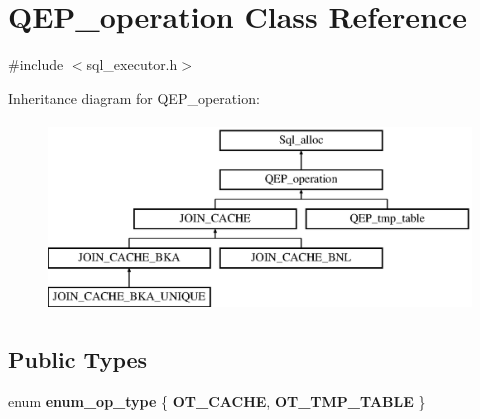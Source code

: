 \hypertarget{classQEP__operation}{}\section{Q\+E\+P\+\_\+operation Class Reference}
\label{classQEP__operation}


{\ttfamily \#include $<$sql\+\_\+executor.\+h$>$}

Inheritance diagram for Q\+E\+P\+\_\+operation\+:\begin{figure}[H]
\begin{center}
\leavevmode
\includegraphics[height=5.000000cm]{classQEP__operation}
\end{center}
\end{figure}
\subsection*{Public Types}
\begin{DoxyCompactItemize}
\item 
\mbox{\label{classQEP__operation_a2ae145e1ebfcc37dac626052a034ed25}} 
enum {\bfseries enum\+\_\+op\+\_\+type} \{ {\bfseries O\+T\+\_\+\+C\+A\+C\+HE}, 
{\bfseries O\+T\+\_\+\+T\+M\+P\+\_\+\+T\+A\+B\+LE}
 \}
\end{DoxyCompactItemize}
